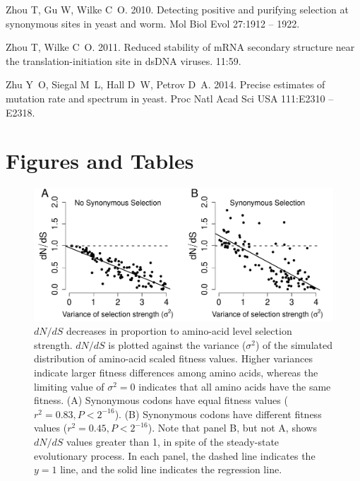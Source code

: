 \documentclass[11pt]{article}
\begin{document}
\begin{thebibliography}{79}
Zhou T, Gu W, Wilke C~O. 2010.
\newblock Detecting positive and purifying selection at synonymous sites in
  yeast and worm.
\newblock Mol Biol Evol 27:1912 -- 1922.

Zhou T, Wilke C~O. 2011.
\newblock Reduced stability of {mRNA} secondary structure near the
  translation-initiation site in {dsDNA} viruses.
 11:59.

Zhu Y~O, Siegal M~L, Hall D~W, Petrov D~A. 2014.
\newblock Precise estimates of mutation rate and spectrum in yeast.
\newblock Proc Natl Acad Sci USA 111:{E}2310 -- {E}2318.

\end{thebibliography}

\newpage
	
	
\section*{Figures and Tables}

\vspace{2cm}
	
\begin{figure}[htbp]
	\centerline{\includegraphics[width=12cm]{figures/MainText/dnds_variance.pdf}}
	\caption{\label{dnds_variance} $dN/dS$ decreases in proportion to amino-acid level selection strength. $dN/dS$ is plotted against the variance ($\sigma^2$) of the simulated distribution of amino-acid scaled fitness values. Higher variances indicate larger fitness differences among amino acids, whereas the limiting value of $\sigma^2 = 0$ indicates that all amino acids have the same fitness. (A) Synonymous codons have equal fitness values ($r^2=0.83, P < 2^{-16}$). (B) Synonymous codons have different fitness values ($r^2=0.45, P < 2^{-16}$). Note that panel B, but not A, shows $dN/dS$ values greater than 1, in spite of the steady-state evolutionary process. In each panel, the dashed line indicates the $y=1$ line, and the solid line indicates the regression line.}
\end{figure}
		
\end{document}
